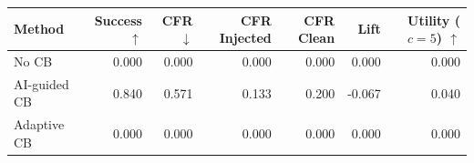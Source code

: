 \begin{tabular}{lrrrrrr}
\toprule
Method & Success $\uparrow$ & CFR $\downarrow$ & CFR Injected & CFR Clean & Lift & Utility ($c=5$) $\uparrow$ \\
\midrule
No CB & 0.000 & 0.000 & 0.000 & 0.000 & 0.000 & 0.000 \\
AI-guided CB & 0.840 & 0.571 & 0.133 & 0.200 & -0.067 & 0.040 \\
Adaptive CB & 0.000 & 0.000 & 0.000 & 0.000 & 0.000 & 0.000 \\
\bottomrule
\end{tabular}
